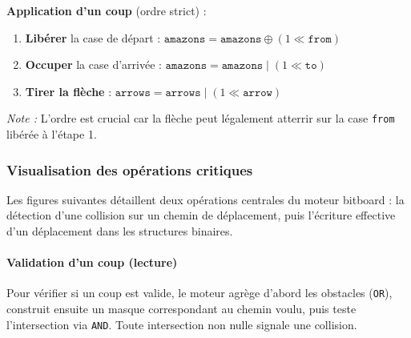 \documentclass[a4paper]{article}
\begin{document}
\textbf{Application d'un coup} (ordre strict) :
\begin{enumerate}
    \item \textbf{Libérer} la case de départ : $\texttt{amazons} = \texttt{amazons} \oplus (1 \ll \texttt{from})$
    \item \textbf{Occuper} la case d'arrivée : $\texttt{amazons} = \texttt{amazons} \mid (1 \ll \texttt{to})$
    \item \textbf{Tirer la flèche} : $\texttt{arrows} = \texttt{arrows} \mid (1 \ll \texttt{arrow})$
\end{enumerate}

\textit{Note :} L'ordre est crucial car la flèche peut légalement atterrir sur la case \texttt{from} libérée à l'étape 1.

\subsubsection{Visualisation des opérations critiques}

Les figures suivantes détaillent deux opérations centrales du moteur bitboard : la détection d'une collision sur un chemin de déplacement, puis l'écriture effective d'un déplacement dans les structures binaires.

\paragraph{Validation d'un coup (lecture)}

Pour vérifier si un coup est valide, le moteur agrège d'abord les obstacles (\texttt{OR}), construit ensuite un masque correspondant au chemin voulu, puis teste l'intersection via \texttt{AND}. Toute intersection non nulle signale une collision.
\end{document}
